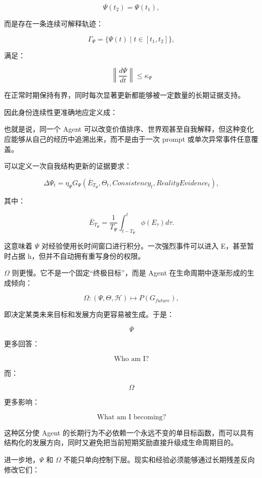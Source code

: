 \[
\Psi(t_2)=\Psi(t_1),
\]

而是存在一条连续可解释轨迹：

\[
\Gamma_\Psi
=
\{\Psi(t)\mid t\in[t_1,t_2]\},
\]

满足：

\[
\left\|
\frac{d\Psi}{dt}
\right\|
\leq
\kappa_\Psi
\]

在正常时期保持有界，同时每次显著更新都能够被一定数量的长期证据支持。

因此身份连续性更准确地应定义成：

\begin{statementbox}
\centering
{}
\end{statementbox}

也就是说，同一个 Agent 可以改变价值排序、世界观甚至自我解释，但这种变化应能够从自己的经历中追溯出来，而不是由于一次 prompt 或单次异常事件任意覆盖。

可以定义一次自我结构更新的证据要求：

\[
\Delta\Psi_t
=
\eta_\Psi
G_\Psi
\left(
\overline{E}_{T_\Psi},
\Theta_t,
Consistency_t,
RealityEvidence_t
\right),
\]

其中：

\[
\overline{E}_{T_\Psi}
=
\frac{1}{T_\Psi}
\int_{t-T_\Psi}^{t}
\phi(E_\tau)d\tau.
\]

这意味着 $\Psi$ 对经验使用长时间窗口进行积分。一次强烈事件可以进入 E，甚至暂时占据 h，但并不自动拥有重写身份的权限。

$\Omega$ 则更慢。它不是一个固定“终极目标”，而是 Agent 在生命周期中逐渐形成的生成倾向：

\[
\Omega
:
(\Psi,\Theta,\mathcal{H})
\mapsto
P(G_{future}),
\]

即决定某类未来目标和发展方向更容易被生成。于是：

\[
\Psi
\]

更多回答：

\[
\text{Who am I?}
\]

而：

\[
\Omega
\]

更多影响：

\[
\text{What am I becoming?}
\]

这种区分使 Agent 的长期行为不必依赖一个永远不变的单目标函数，而可以具有结构化的发展方向，同时又避免把当前短期奖励直接升级成生命周期目的。

进一步地，$\Psi$ 和 $\Omega$ 不能只单向控制下层。现实和经验必须能够通过长期残差反向修改它们：

